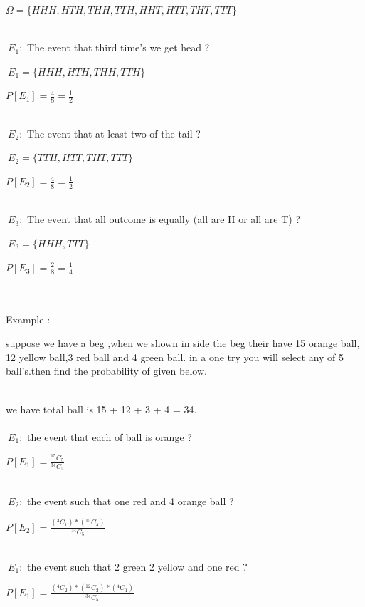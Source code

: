 \documentclass[a4paper,12pt]{article}
\theoremstyle{definition}
\begin{document}
 \begin{center}
    $\Omega =\{HHH,HTH,THH,TTH,HHT,HTT,THT,TTT \} $  
 \end{center}\\
\Par $\ E_1 : $ The event that third time's we get head ?\\
\par $\ E_1 =\{HHH,HTH,THH,TTH\} $\\
\begin{center}
    $ P[E_1] = \frac{4}{8} = \frac{1}{2}$
\end{center}\\
\Par $\ E_2 : $ The event that at least two of the tail ?\\
\par $\ E_2 =\{TTH,HTT,THT,TTT\} $\\
\begin{center}
    $ P[E_2] = \frac{4}{8} = \frac{1}{2}$
\end{center}\\ 
\Par $\ E_3 : $ The event that all outcome is equally (all are H or all are T) ?\\
\par $\ E_3 =\{HHH,TTT\} $\\
\begin{center}
    $ P[E_3] = \frac{2}{8} = \frac{1}{4}$
\end{center}\\
\vskip 0.25cm\\
Example :
\par suppose we have a beg ,when we shown in side the beg their have 15 orange ball, 12 yellow ball,3 red ball and 4 green ball. in a one try you will select any of 5 ball's.then find the probability  of given below.\\
\vskip 0.5cm\\
\par we have total ball is 15 + 12 + 3 + 4 = 34. \\
\\ 
\Par $\ E_1 : $ the event that each of ball is orange ?\\
\begin{center}
    $ P[E_1] = \frac{^{15}C_5}{^{34}C_5} $
\end{center}\\
\Par $\ E_2 : $ the event such that one red and 4 orange ball ?\\
\begin{center}
    $ P[E_2] = \frac{(^{3}C_1)*(^{15}C_4)}{^{34}C_5} $\\
\end{center}\\
\Par $\ E_1 : $ the event such that 2 green 2 yellow and one red ?\\
\begin{center}
    $ P[E_1] = \frac{(^{4}C_2)*(^{12}C_2)*(^{4}C_1)}{^{34}C_5} $\\
\end{center}\\
\end{document}
